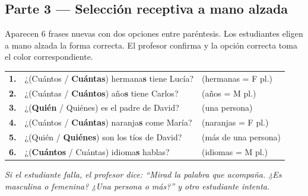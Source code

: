 \documentclass[a4paper,10pt]{article}
\renewcommand{\arraystretch}{1.3}
\begin{document}
\vspace{0.2cm}

\begin{center}
\end{center}

\vspace{0.4cm}

\subsection*{\textcolor{naranja}{Parte 3 --- Selección receptiva a mano alzada}}

{\small Aparecen 6 frases nuevas con dos opciones entre paréntesis. Los estudiantes eligen a mano alzada la forma correcta. El profesor confirma y la opción correcta toma el color correspondiente.}

\vspace{0.2cm}

\renewcommand{\arraystretch}{1.5}
\begin{tabular}{@{}r p{10cm} l@{}}
\textbf{1.} & ¿(Cuántos / \textcolor{rosafem}{\textbf{Cuántas}}) hermana\textbf{s} tiene Lucía? & \textcolor{rosafem}{\small (hermanas = F pl.)} \\
\textbf{2.} & ¿(Cuántas / \textcolor{azulmasc}{\textbf{Cuántos}}) año\textbf{s} tiene Carlos? & \textcolor{azulmasc}{\small (años = M pl.)} \\
\textbf{3.} & ¿(\textbf{Quién} / Quiénes) es el padre de David? & {\small (una persona)} \\
\textbf{4.} & ¿(Cuántos / \textcolor{rosafem}{\textbf{Cuántas}}) naranja\textbf{s} come María? & \textcolor{rosafem}{\small (naranjas = F pl.)} \\
\textbf{5.} & ¿(Quién / \textbf{Quiénes}) son los tíos de David? & {\small (más de una persona)} \\
\textbf{6.} & ¿(\textcolor{azulmasc}{\textbf{Cuántos}} / Cuántas) idioma\textbf{s} hablas? & \textcolor{azulmasc}{\small (idiomas = M pl.)} \\
\end{tabular}

\vspace{0.2cm}

\begin{tcolorbox}[colback=gris, colframe=grismedio, boxrule=0.5pt, arc=2pt]
\textit{Si el estudiante falla, el profesor dice: ``Mirad la palabra que acompaña. ¿Es masculina o femenina? ¿Una persona o más?'' y otro estudiante intenta.}
\end{tcolorbox}
\end{document}
